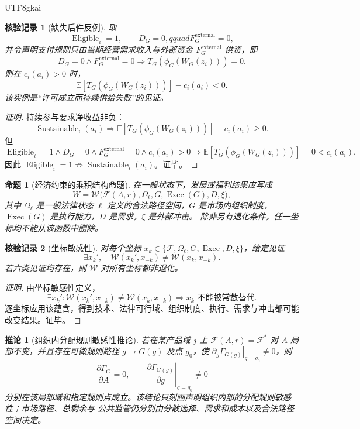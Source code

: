 \documentclass[12pt,a4paper,openany]{report}
\newtheorem{proposition}{命题}[chapter]
\newtheorem{corollary}{推论}[chapter]
\newtheorem{Certificate}{核验记录}[chapter]
\newcommand{\EE}{\mathbb E}
\newcommand{\Feas}{\mathcal F}
\DeclareMathOperator{\Eligible}{Eligible}
\DeclareMathOperator{\Sustainable}{Sustainable}
\begin{document}
\begin{CJK*}{UTF8}{gkai}
\begin{Certificate}[缺失后件反例]
取
\[
  \Eligible_i=1,\qquad D_G=0,qquad F_G^{\mathrm{external}}=0,
\]
并令声明支付规则只由当期经营需求收入与外部资金
\(F_G^{\mathrm{external}}\) 供资，即
\[
  D_G=0\wedge F_G^{\mathrm{external}}=0
  \Longrightarrow
  T_G(\phi_G(W_G(z_i)))=0.
\]
则在 \(c_i(a_i)>0\) 时，
\[
  \EE[T_G(\phi_G(W_G(z_i)))]-c_i(a_i)<0.
\]
该实例是“许可成立而持续供给失败”的见证。
\end{Certificate}

\begin{proof}[证明]
持续参与要求净收益非负：
\[
  \Sustainable_i(a_i)
  \Longrightarrow
  \EE[T_G(\phi_G(W_G(z_i)))]-c_i(a_i)\ge0.
\]
但
\[
  \Eligible_i=1\wedge D_G=0\wedge F_G^{\mathrm{external}}=0
  \wedge c_i(a_i)>0
  \Longrightarrow
  \EE[T_G(\phi_G(W_G(z_i)))]=0<c_i(a_i).
\]
因此 \(\Eligible_i=1\not\Longrightarrow\Sustainable_i(a_i)\)。证毕。
\end{proof}

\begin{proposition}[经济约束的乘积结构命题]
\label{prop:economic-product-structure}
在一般状态下，发展或福利结果应写成
\[
  W=\mathcal W\bigl(\Feas(A,r),\Omega_\ell,G,\operatorname{Exec}(G),D,\xi\bigr),
\]
其中 \(\Omega_\ell\) 是一般法律状态 \(\ell\) 定义的合法路径空间，\(G\) 是市场内组织制度，
\(\operatorname{Exec}(G)\) 是执行能力，\(D\) 是需求，\(\xi\) 是外部冲击。
除非另有退化条件，任一坐标均不能从该函数中删除。
\end{proposition}

\begin{Certificate}[坐标敏感性]
对每个坐标 \(x_k\in\{\Feas,\Omega_\ell,G,\operatorname{Exec},D,\xi\}\)，给定见证
\[
  \exists x_k',\quad
  \mathcal W(x_k',x_{-k})\ne\mathcal W(x_k,x_{-k}).
\]
若六类见证均存在，则 \(\mathcal W\) 对所有坐标都非退化。
\end{Certificate}

\begin{proof}[证明]
由坐标敏感性定义，
\[
  \exists x_k':\mathcal W(x_k',x_{-k})\ne\mathcal W(x_k,x_{-k})
  \Longrightarrow
  x_k\text{ 不能被常数替代}.
\]
逐坐标应用该蕴含，得到技术、法律可行域、组织制度、执行、需求与冲击都可能改变结果。证毕。
\end{proof}

\begin{corollary}[组织内分配规则敏感性推论]
\label{cor:distribution-governance-layer}
若在某产品域 \(j\) 上 \(\Feas(A,r)=\Feas^*\) 对 \(A\) 局部不变，并且存在可微规则路径
\(g\mapsto G(g)\) 及点 \(g_0\)，使
\(\left.\partial_g\Gamma_{G(g)}\right|_{g=g_0}\ne0\)，则
\[
  \frac{\partial \Gamma_G}{\partial A}=0,\qquad
  \left.\frac{\partial \Gamma_{G(g)}}{\partial g}\right|_{g=g_0}\ne0
\]
分别在该局部域和指定规则点成立。该结论只刻画声明组织内部的分配规则敏感性；市场路径、总剩余与
公共监管仍分别由分散选择、需求和成本以及合法路径空间决定。
\end{corollary}


\end{CJK*}
\end{document}

